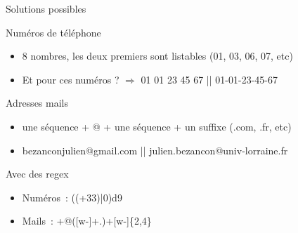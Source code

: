 \documentclass[serif, aspectratio=169]{beamer}
\begin{document}
\begin{frame}{Solutions possibles}
    \begin{block}{Numéros de téléphone}
        \pause
        \begin{itemize}
            \item 8 nombres, les deux premiers sont listables (01, 03, 06, 07, etc)
            \item Et pour ces numéros ? $\Rightarrow$ 01 01 23 45 67 || 01-01-23-45-67
        \end{itemize}
    \end{block}
    \pause
    \begin{block}{Adresses mails}
        \pause
        \begin{itemize}
            \item une séquence + @ + une séquence + un suffixe (.com, .fr, etc)
            \item bezanconjulien@gmail.com || julien.bezancon@univ-lorraine.fr
        \end{itemize}
    \end{block}
    \pause
    \begin{block}{Avec des regex} %
        \begin{itemize}
            \item Numéros~: ((\bs +33)|0)\bs d{9}
            \item Mails~: \nothing [\bs w\bs -\bs .]+@([\bs w-]+\bs .)+[\bs w-]\{2,4\}
        \end{itemize}
    \end{block}
\end{frame}
\end{document}
